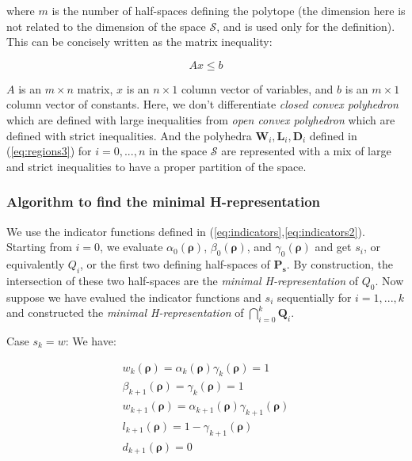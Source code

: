 \noindent where $m$ is the number of half-spaces defining the polytope (the dimension here is not related to the dimension of the space $\mathcal{S}$, and is used only for the definition). This can be concisely written as the matrix inequality:

\begin{equation}
Ax \leq b
\label{eq:matRepresentation}
\end{equation}

\noindent $A$ is an $m\times n$ matrix, $x$ is an $n\times 1$ column vector of variables, and $b$ is an $m\times 1$ column vector of constants. Here, we don't differentiate \textit{closed convex polyhedron} which are defined with large inequalities from \textit{open convex polyhedron} which are defined with strict inequalities. And the polyhedra $\textbf{W}_{i}, \textbf{L}_{i}, \textbf{D}_{i}$ defined in (\ref{eq:regions3}) for $i=0,...,n$ in the space $\mathcal{S}$ are represented with a mix of large and strict inequalities to have a proper partition of the space.


\subsubsection{Algorithm to find the minimal H-representation}\label{sec:minHrepresentation}

We use the indicator functions defined in (\ref{eq:indicators},\ref{eq:indicators2}). Starting from $i=0$, we evaluate $\alpha_{0}(\boldsymbol\rho)$, $\beta_{0}(\boldsymbol\rho)$, and $\gamma_{0}(\boldsymbol\rho)$ and get $s_{i}$, or equivalently $Q_{i}$, or the first two defining half-spaces of $\textbf{P}_{\boldsymbol s}$. By construction, the intersection of these two half-spaces are the \textit{minimal H-representation} of $Q_{0}$. Now suppose we have evalued the indicator functions and $s_{i}$ sequentially for $i=1,...,k$ and constructed the \textit{minimal H-representation} of $\bigcap_{i=0}^{k} \textbf{Q}_{i}$.

Case $s_{k}=w$: We have:

\begin{equation}
\begin{array}{l}
w_{k}(\boldsymbol\rho)=\alpha_{k}(\boldsymbol\rho)\gamma_{k}(\boldsymbol\rho)=1\\
\beta_{k+1}(\boldsymbol\rho)=\gamma_{k}(\boldsymbol\rho)=1\\
w_{k+1}(\boldsymbol\rho)=\alpha_{k+1}(\boldsymbol\rho)\gamma_{k+1}(\boldsymbol\rho)\\
l_{k+1}(\boldsymbol\rho)=1-\gamma_{k+1}(\boldsymbol\rho)\\
d_{k+1}(\boldsymbol\rho)=0
\end{array}
\end{equation}

